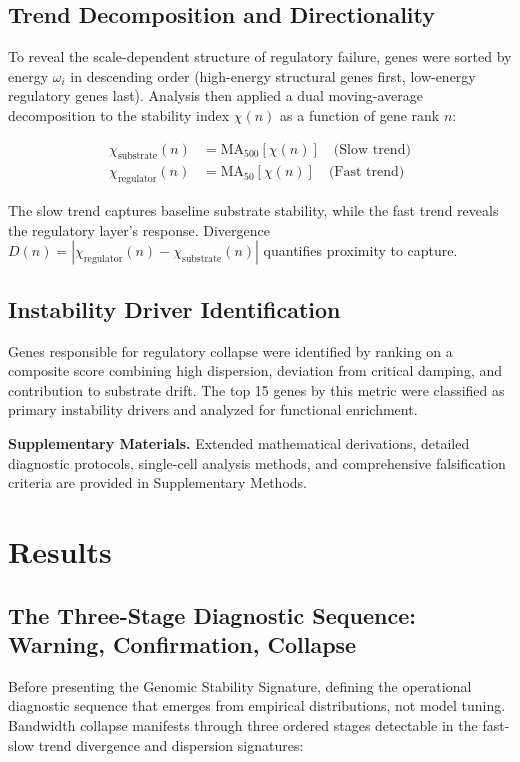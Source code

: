\documentclass[11pt,letterpaper]{article}
\begin{document}
\subsection{Trend Decomposition and Directionality}

To reveal the scale-dependent structure of regulatory failure, genes were sorted by energy $\omega_i$ in descending order (high-energy structural genes first, low-energy regulatory genes last). Analysis then applied a dual moving-average decomposition to the stability index $\chi(n)$ as a function of gene rank $n$:

\begin{align}
\chi_{\text{substrate}}(n) &= \text{MA}_{500}[\chi(n)] \quad \text{(Slow trend)} \\
\chi_{\text{regulator}}(n) &= \text{MA}_{50}[\chi(n)] \quad \text{(Fast trend)}
\end{align}

The slow trend captures baseline substrate stability, while the fast trend reveals the regulatory layer's response. Divergence $D(n) = |\chi_{\text{regulator}}(n) - \chi_{\text{substrate}}(n)|$ quantifies proximity to capture.

\subsection{Instability Driver Identification}

Genes responsible for regulatory collapse were identified by ranking on a composite score combining high dispersion, deviation from critical damping, and contribution to substrate drift. The top 15 genes by this metric were classified as primary instability drivers and analyzed for functional enrichment.

\textbf{Supplementary Materials.} Extended mathematical derivations, detailed diagnostic protocols, single-cell analysis methods, and comprehensive falsification criteria are provided in Supplementary Methods.

\section{Results}

\subsection{The Three-Stage Diagnostic Sequence: Warning, Confirmation, Collapse}

Before presenting the Genomic Stability Signature, defining the operational diagnostic sequence that emerges from empirical distributions, not model tuning. Bandwidth collapse manifests through three ordered stages detectable in the fast-slow trend divergence and dispersion signatures:
\end{document}
